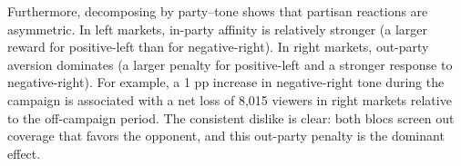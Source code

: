 \documentclass[12pt]{article}
\begin{document}
Furthermore, decomposing by party–tone shows that partisan reactions are asymmetric. In left markets, in-party affinity is relatively stronger (a larger reward for positive-left than for negative-right). In right markets, out-party aversion dominates (a larger penalty for positive-left and a stronger response to negative-right). For example, a 1 pp increase in negative-right tone during the campaign is associated with a net loss of 8,015 viewers in right markets relative to the off-campaign period. The consistent dislike is clear: both blocs screen out coverage that favors the opponent, and this out-party penalty is the dominant effect. 

	
	
	
	
	

	

	
\end{document}
